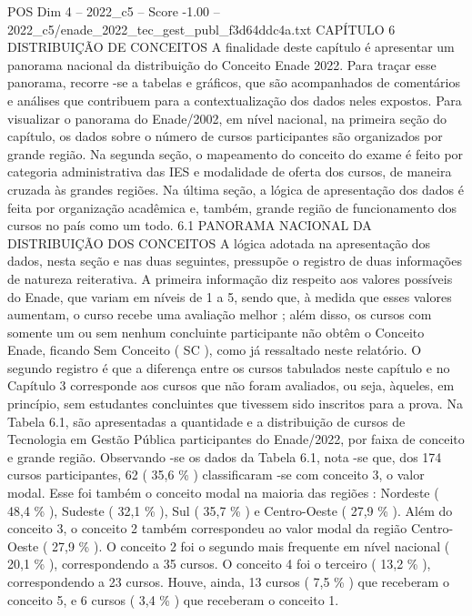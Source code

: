 \begin{textsample}{POS Dim 4 – 2022\_c5 – Score -1.00 – 2022\_c5/enade\_2022\_tec\_gest\_publ\_f3d64ddc4a.txt}  \label{ex:f4_pos_285}
CAPÍTULO 6 DISTRIBUIÇÃO DE CONCEITOS A finalidade deste capítulo é apresentar um panorama nacional da distribuição do Conceito Enade 2022.
Para traçar esse panorama, recorre -se a tabelas e gráficos, que são acompanhados de comentários e análises que contribuem para a contextualização dos dados neles expostos.
Para visualizar o panorama do Enade/2002, em nível nacional, na primeira seção do capítulo, os dados sobre o número de cursos participantes são organizados por grande região.
Na segunda seção, o mapeamento do conceito do exame é feito por categoria administrativa das IES e modalidade de oferta dos cursos, de maneira cruzada às grandes regiões.
Na última seção, a lógica de apresentação dos dados é feita por organização acadêmica e, também, grande região de funcionamento dos cursos no país como um todo. 6.1 PANORAMA NACIONAL DA DISTRIBUIÇÃO DOS CONCEITOS A lógica adotada na apresentação dos dados, nesta seção e nas duas seguintes, pressupõe o registro de duas informações de natureza reiterativa.
A primeira informação diz respeito aos valores possíveis do Enade, que variam em níveis de 1 a 5, sendo que, à medida que esses valores aumentam, o curso recebe uma avaliação melhor ; além disso, os cursos com somente um ou sem nenhum concluinte participante não obtêm o Conceito Enade, ficando Sem Conceito ( SC ), como já ressaltado neste relatório.
O segundo registro é que a diferença entre os cursos tabulados neste capítulo e no Capítulo 3 corresponde aos cursos que não foram avaliados, ou seja, àqueles, em princípio, sem estudantes concluintes que tivessem sido inscritos para a prova.
Na Tabela 6.1, são apresentadas a quantidade e a distribuição de cursos de Tecnologia em Gestão Pública participantes do Enade/2022, por faixa de conceito e grande região.
Observando -se os dados da Tabela 6.1, nota -se que, dos 174 cursos participantes, 62 ( 35,6 \% ) classificaram -se com conceito 3, o valor modal.
Esse foi também o conceito modal na maioria das regiões : Nordeste ( 48,4 \% ), Sudeste ( 32,1 \% ), Sul ( 35,7 \% ) e Centro-Oeste ( 27,9 \% ).
Além do conceito 3, o conceito 2 também correspondeu ao valor modal da região Centro-Oeste ( 27,9 \% ).
O conceito 2 foi o segundo mais frequente em nível nacional ( 20,1 \% ), correspondendo a 35 cursos.
O conceito 4 foi o terceiro ( 13,2 \% ), correspondendo a 23 cursos.
Houve, ainda, 13 cursos ( 7,5 \% ) que receberam o conceito 5, e 6 cursos ( 3,4 \% ) que receberam o conceito 1.

\end{textsample}
